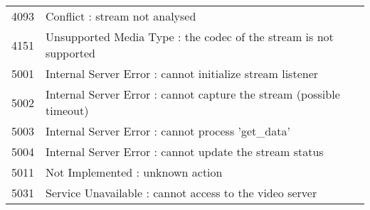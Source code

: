 \begin{tabular}{|r|l|}
4093 &Conflict \-: stream not analysed \\\cline{1-2}
4151 &Unsupported Media Type \-: the codec of the stream is not supported \\\cline{1-2}
5001 &Internal Server Error \-: cannot initialize stream listener \\\cline{1-2}
5002 &Internal Server Error \-: cannot capture the stream (possible timeout) \\\cline{1-2}
5003 &Internal Server Error \-: cannot process 'get\-\_\-data' \\\cline{1-2}
5004 &Internal Server Error \-: cannot update the stream status \\\cline{1-2}
5011 &Not Implemented \-: unknown action \\\cline{1-2}
5031 &Service Unavailable \-: cannot access to the video server \\\cline{1-2}
\end{tabular}
